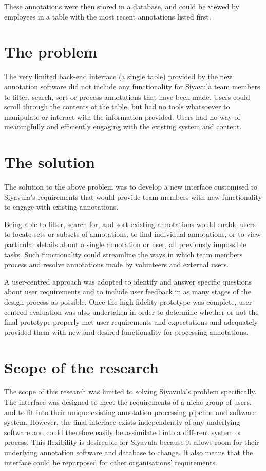 These annotations were then stored in a database, and could be viewed by employees in a table  with the most recent annotations listed first. 

\section{The problem}
The very limited back-end interface (a single table) provided by the new annotation software did not include any functionality for Siyavula team members to filter, search, sort or process annotations that have been made. Users could scroll through the contents of the table, but had no tools whatsoever to manipulate or interact with the information provided. Users had no way of meaningfully and efficiently engaging with the existing system and content.




\section{The solution}
The solution to the above problem was to develop a new interface customised to Siyavula's requirements that would provide team members with new functionality to engage with existing annotations. 

Being able to filter, search for, and sort existing annotations would enable users to locate sets or subsets of annotations, to find individual annotations, or to view particular details about a single annotation or user, all previously impossible tasks. Such functionality could streamline the ways in which team members process and resolve annotations made by volunteers and external users.

A user-centred approach was adopted to identify and answer specific questions about user requirements and to include user feedback in as many stages of the design process as possible. Once the high-fidelity prototype was complete, user-centred evaluation was also undertaken in order to determine whether or not the final prototype properly met user requirements and expectations and adequately provided them with new and desired functionality for processing annotations. 

\section{Scope of the research}
The scope of this research was limited to solving Siyavula's problem specifically. The interface was designed to meet the requirements of a niche group of users, and to fit into their unique existing annotation-processing pipeline and software system. However, the final interface exists independently of any underlying software and could therefore easily be assimilated into a different system or process. This flexibility is desireable for Siyavula because it allows room for their underlying annotation software and database to change. It also means that the interface could be repurposed for other organisations' requirements.

